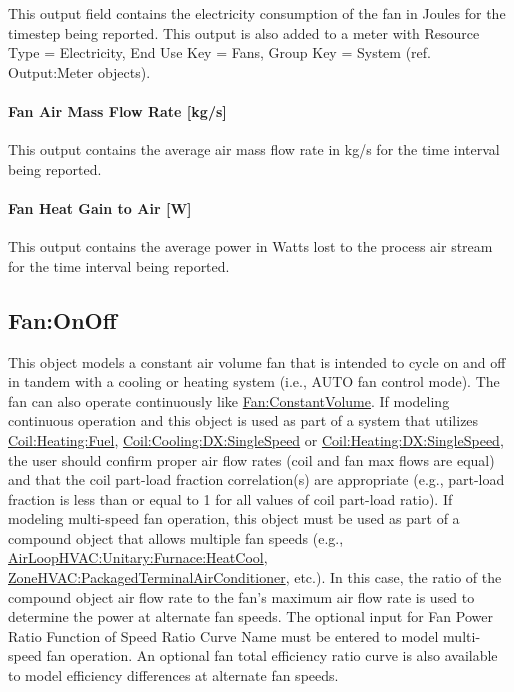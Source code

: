 This output field contains the electricity consumption of the fan in Joules for the timestep being reported. This output is also added to a meter with Resource Type = Electricity, End Use Key = Fans, Group Key = System (ref. Output:Meter objects).

\paragraph{Fan Air Mass Flow Rate {[}kg/s{]}}\label{fan-air-mass-flow-kgs}

This output contains the average air mass flow rate in kg/s for the time interval being reported.

\paragraph{Fan Heat Gain to Air {[}W{]}}\label{fan-heat-gain-to-air-w}

This output contains the average power in Watts lost to the process air stream for the time interval being reported.

\subsection{Fan:OnOff}\label{fanonoff}

This object models a constant air volume fan that is intended to cycle on and off in tandem with a cooling or heating system (i.e., AUTO fan control mode). The fan can also operate continuously like \hyperref[fanconstantvolume]{Fan:ConstantVolume}. If modeling continuous operation and this object is used as part of a system that utilizes \hyperref[coilheatinggas-000]{Coil:Heating:Fuel}, \hyperref[coilcoolingdxsinglespeed]{Coil:Cooling:DX:SingleSpeed} or \hyperref[coilheatingdxsinglespeed]{Coil:Heating:DX:SingleSpeed}, the user should confirm proper air flow rates (coil and fan max flows are equal) and that the coil part-load fraction correlation(s) are appropriate (e.g., part-load fraction is less than or equal to 1 for all values of coil part-load ratio). If modeling multi-speed fan operation, this object must be used as part of a compound object that allows multiple fan speeds (e.g., \hyperref[airloophvacunitaryfurnaceheatcool]{AirLoopHVAC:Unitary:Furnace:HeatCool}, \hyperref[zonehvacpackagedterminalairconditioner]{ZoneHVAC:PackagedTerminalAirConditioner}, etc.). In this case, the ratio of the compound object air flow rate to the fan's maximum air flow rate is used to determine the power at alternate fan speeds. The optional input for Fan Power Ratio Function of Speed Ratio Curve Name must be entered to model multi-speed fan operation. An optional fan total efficiency ratio curve is also available to model efficiency differences at alternate fan speeds.

